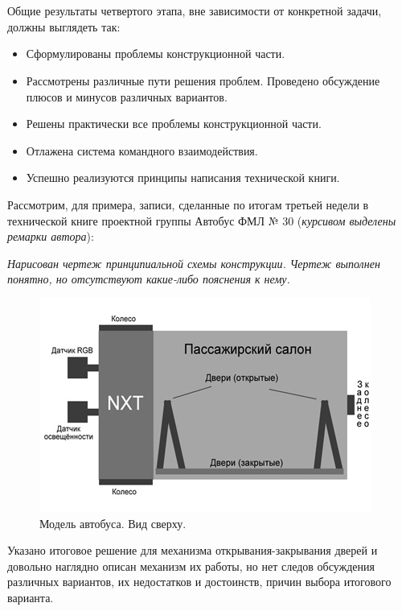 {\hypertarget{lesson26x6}{}}\\\\	

Общие результаты четвертого этапа, вне зависимости от конкретной задачи, должны выглядеть так:

\begin{itemize}
	\item Сформулированы  проблемы конструкционной части.
	\item Рассмотрены различные пути решения проблем. Проведено обсуждение плюсов и минусов различных вариантов.
	\item Решены практически все проблемы конструкционной части.
	\item Отлажена система командного взаимодействия.
	\item Успешно реализуются принципы написания технической книги.
\end{itemize}

Рассмотрим, для примера, записи, сделанные по итогам третьей недели в технической книге проектной группы Автобус ФМЛ № 30 ({\slshape курсивом выделены ремарки автора}): 

{\slshape Нарисован чертеж принципиальной схемы конструкции. Чертеж выполнен понятно, но отсутствуют какие-либо пояснения к нему.
	
	\begin{figure}[h!]
		\begin{center}
			\includegraphics[width=1\linewidth]{chapters/chapter26/images/1}
			\caption{Модель автобуса. Вид сверху.}
			\label{ris:image26x1}
		\end{center}
	\end{figure}
	
	Указано итоговое решение для механизма открывания-закрывания дверей и довольно наглядно описан механизм их работы, но нет следов обсуждения различных вариантов, их недостатков и достоинств, причин выбора итогового варианта.}

